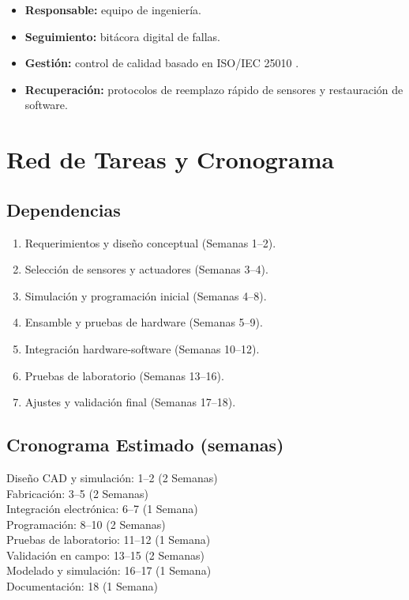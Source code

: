\documentclass[conference]{IEEEtran}
\begin{document}
	\begin{itemize}
		\item \textbf{Responsable:} equipo de ingeniería.
		\item \textbf{Seguimiento:} bitácora digital de fallas.
		\item \textbf{Gestión:} control de calidad basado en ISO/IEC 25010 \cite{b24}.
		\item \textbf{Recuperación:} protocolos de reemplazo rápido de sensores y restauración de software.
	\end{itemize}
	
	\section{Red de Tareas y Cronograma}
	
	\subsection{Dependencias}
	
	\begin{enumerate}
		\item Requerimientos y diseño conceptual (Semanas 1--2).
		\item Selección de sensores y actuadores (Semanas 3--4).
		\item Simulación y programación inicial (Semanas 4--8).
		\item Ensamble y pruebas de hardware (Semanas 5--9).
		\item Integración hardware-software (Semanas 10--12).
		\item Pruebas de laboratorio (Semanas 13--16).
		\item Ajustes y validación final (Semanas 17--18).
	\end{enumerate}
	
	\subsection{Cronograma Estimado (semanas)}
	
Diseño CAD y simulación: 1--2 (2 Semanas)\\
	Fabricación: 3--5 (2 Semanas)\\
	Integración electrónica: 6--7 (1 Semana)\\
	Programación: 8--10 (2 Semanas)\\
	Pruebas de laboratorio: 11--12 (1 Semana)\\
	Validación en campo: 13--15 (2 Semanas)\\
	Modelado y simulación: 16--17 (1 Semana)\\
	Documentación: 18 (1 Semana)
	
\end{document}
